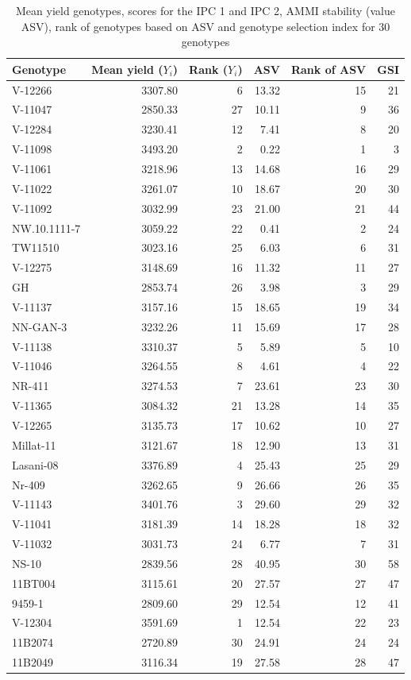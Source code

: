\begin{table}[h!]
	\centering
	\caption[AMMI stability values]{Mean yield genotypes, scores for the IPC 1 and IPC 2, AMMI stability (value ASV), rank of genotypes based on ASV and genotype  selection index for 30 genotypes } 
	\label{Table:4.3}
\begin{tabular}{l r r r r r} 
		\toprule \hline
   Genotype & Mean yield ($Y_i$) & Rank ($Y_i$) & ASV & Rank of ASV & GSI\\ 
	\midrule \hline



		
	V-12266  & 3307.80 & 6  & 13.32 & 15 & 21 \\
	V-11047  & 2850.33 & 27 & 10.11 & 9  & 36 \\
	V-12284  & 3230.41 & 12 & 7.41  & 8  & 20\\
	V-11098  & 3493.20 & 2  & 0.22  & 1  &  3\\
	V-11061  & 3218.96 & 13 & 14.68 & 16 &  29 \\
	V-11022  & 3261.07 & 10 & 18.67 & 20 & 30   \\
	V-11092  & 3032.99 & 23 & 21.00 & 21 & 44   \\
NW.10.1111-7 & 3059.22 & 22 & 0.41  & 2  & 24  \\
	TW11510  & 3023.16 & 25 & 6.03  & 6  & 31  \\
	V-12275  & 3148.69 & 16 & 11.32 & 11 & 27 \\ 
	GH       & 2853.74 & 26 & 3.98  & 3  & 29 \\
	V-11137  & 3157.16 & 15 & 18.65 & 19 & 34 \\
	NN-GAN-3 & 3232.26 & 11 & 15.69 & 17 & 28 \\
	V-11138  & 3310.37 & 5  & 5.89  & 5  & 10 \\
	V-11046  & 3264.55 & 8  & 4.61  & 4  & 22 \\
	NR-411   & 3274.53 & 7  & 23.61 & 23 & 30 \\
	V-11365  & 3084.32 & 21 & 13.28 & 14 & 35 \\
	V-12265  & 3135.73 & 17 & 10.62 & 10 & 27 \\
	Millat-11& 3121.67 & 18 & 12.90 & 13 & 31 \\
Lasani-08    & 3376.89 & 4  & 25.43 & 25 & 29 \\
	Nr-409   & 3262.65 & 9  & 26.66 & 26 & 35 \\
	V-11143  & 3401.76 & 3  & 29.60 & 29 & 32 \\ 
	V-11041  & 3181.39 & 14 & 18.28 & 18 & 32 \\
	V-11032  & 3031.73 & 24 & 6.77  & 7  & 31 \\
	NS-10    & 2839.56 & 28 & 40.95 & 30 & 58 \\
	11BT004  & 3115.61 & 20 & 27.57 & 27 & 47 \\
	9459-1   & 2809.60 & 29 & 12.54 & 12 & 41 \\
	V-12304  & 3591.69 & 1  & 12.54 & 22 & 23 \\
	11B2074  & 2720.89 & 30 & 24.91 & 24 & 24 \\
	11B2049  & 3116.34 & 19 & 27.58 & 28 & 47 \\
	 \bottomrule\hline
\end{tabular}
\end{table} 

